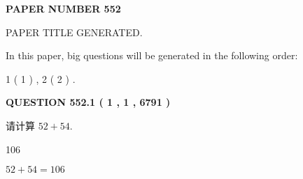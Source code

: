 \documentclass{ctexart}
\begin{document}
   
   
   
\newpage 
\setcounter{page}{ 
   552001 } 
   
   
   
   
 {\textbf{ \Large{ PAPER NUMBER  552  }}}
   
   
\vspace{0.2in}
   
   
   
   
   
   
   
   
 \vspace{0.2in}
 
 
 
 
   
   
 PAPER TITLE GENERATED.
   
   
   
\vspace{0.2in}
   
In this paper, big questions will be generated in the following order: 
   
   
   1 ( 1 )
 ,
   2 ( 2 )
 .
  
\vspace{0.2in}
  
{\textbf{\Large{QUESTION
552.1 
 ( 1 , 1 , 6791 )
}}}
  
  
 
请计算 $ %
52 +  %
54 $.
 
 
 
\noindent{}
 
 

106
 
 
\noindent{}
 
 

 
 
 
\noindent{}
 
 

$ %
52 +  %
54=   %
106$
 
 
\noindent{}
 
 

 
   
   
   
\end{document}
